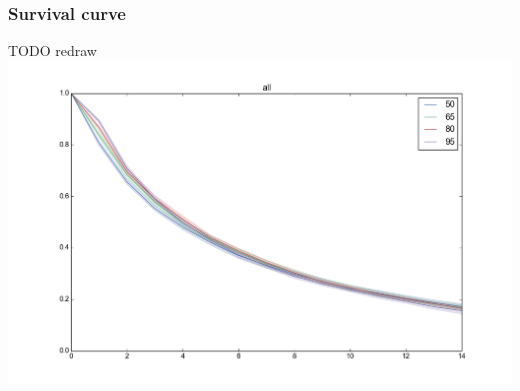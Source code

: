 \documentclass[bigger]{beamer}
\begin{document}
\begin{frame}
  \frametitle{Survival curve}
  TODO redraw
  \includegraphics[width=\textwidth]{img/survival-curve}
\end{frame}
\end{document}
